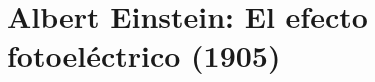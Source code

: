 \documentclass{article}
\begin{document}






\section{Albert Einstein: El efecto fotoeléctrico (1905)}
\end{document}
